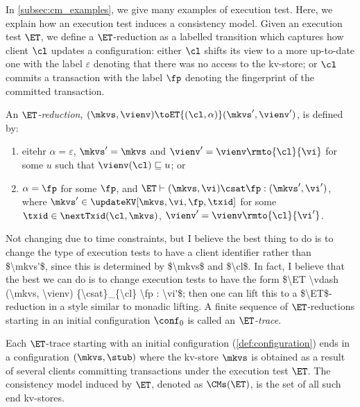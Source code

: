 In \cref{subsec:cm_examples}, we give many examples of execution test. Here, we
explain how an execution test induces a consistency model. Given an execution test $\ET$, 
we define a $\ET$-reduction as a labelled transition which captures how
client $\cl$ updates a  configuration:  either  $\cl$
shifts its view to a more up-to-date one
with  the label $\varepsilon$ denoting  that 
	there was no access to the kv-store; or  $\cl$ 
	commits a transaction with the label $\fp$  denoting the
        fingerprint of the committed transaction.

\begin{definition}[ET-reduction]
An \emph{$\ET$-reduction}, $(\mkvs, \vienv) \toET{(\cl, \alpha)} (\mkvs', \vienv')$, is defined by:
\begin{enumerate}
    \item eitehr $\alpha = \varepsilon$, $\mkvs' = \mkvs$ and $\vienv' =
      \vienv\rmto{\cl}{\vi}$ for some $u$ such that $ \vienv(\cl) \sqsubseteq u$; or
\item $\alpha = \fp$ for some $\fp$, and $\ET \vdash (\mkvs, \vi ) \csat \fp : (\mkvs', \vi')$, where $\mkvs' \in \updateKV[\mkvs, \vi, \fp, \txid]$ 
   for some $\txid \in \nextTxid(\cl, \mkvs)$, $\vienv' =
   \vienv\rmto{\cl}{\vi'}$.
\end{enumerate}
\ac{Not changing due to time constraints, but I believe the best thing to do is to change the type of execution tests to have a client identifier 
rather than $\mkvs'$, since this is determined by $\mkvs$ and $\cl$. In fact, I believe that the best we can do is to change execution tests to 
have the form $\ET \vdash (\mkvs, \vienv) {\csat}_{\cl} \fp : \vi'$; then one can lift this to a $\ET$-reduction in a style similar to monadic lifting.}
A finite sequence of $\ET$-reductions starting in an
initial configuration $\conf_{0}$ is called  an \emph{$\ET$-trace}. 
\end{definition}
Each $\ET$-trace  starting with an initial configuration
(\cref{def:configuration}) ends in a configuration $(\mkvs, \stub)$ where the 
kv-store $\mkvs$ is obtained as a result of several clients committing transactions under the 
execution test $\ET$. The consistency model induced by $\ET$, 
denoted as $\CMs(\ET)$, is the set of all such end kv-stores.
%
